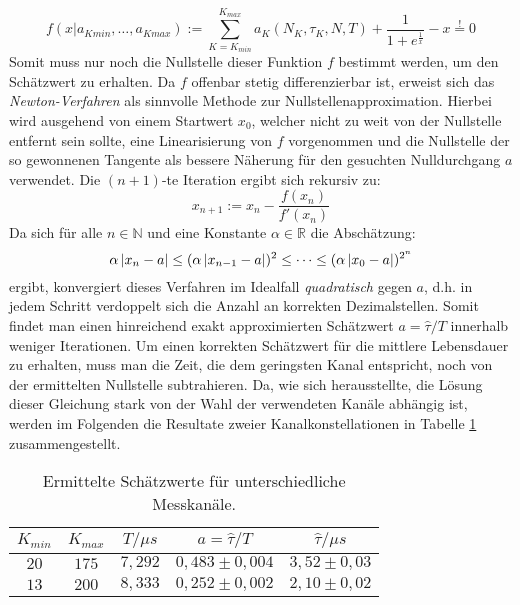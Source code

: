 		\begin{equation} \label{eq:mastereq}
					f(x|a_{Kmin},\dots,a_{Kmax}) := \sum_{K = K_{min}}^{K_{max}} a_K(N_K,\tau_K,N,T) + \frac{1}{1 + e^{\frac{1}{x}}} - x \overset{!}{=} 0  
		\end{equation}
	Somit muss nur noch die Nullstelle dieser Funktion $f$ bestimmt werden, um den Schätzwert zu erhalten. Da $f$ offenbar stetig differenzierbar ist, erweist sich das \textit{Newton-Verfahren} als sinnvolle Methode zur Nullstellenapproximation. Hierbei wird ausgehend von einem Startwert $x_0$, welcher nicht zu weit von der Nullstelle entfernt sein sollte, eine Linearisierung von $f$ vorgenommen und die Nullstelle der so gewonnenen Tangente als bessere Näherung für den gesuchten Nulldurchgang $a$ verwendet. Die $(n+1)$-te Iteration ergibt sich rekursiv zu:
		\begin{equation} 
			x_{n+1} := x_n - \frac{f(x_n)}{f'(x_n)}
		\end{equation}
	Da sich für alle $n\in \mathbb{N}$ und eine Konstante $\alpha\in \mathbb{R}$ die Abschätzung:
		 \begin{equation} 
		 			\alpha \left\vert x_{n}-a\right\vert\leq (\alpha \left\vert x_{n-1}-a\right\vert)^2\leq \dots \leq (\alpha\left\vert x_0-a\right\vert)^{2^n}
		 \end{equation}
	ergibt, konvergiert dieses Verfahren im Idealfall \textit{quadratisch} gegen $a$, d.h. in jedem Schritt verdoppelt sich die Anzahl an korrekten Dezimalstellen. Somit findet man einen hinreichend exakt approximierten Schätzwert $a = \hat{\tau}/T$ innerhalb weniger Iterationen. Um einen korrekten Schätzwert für die mittlere Lebensdauer zu erhalten, muss man die Zeit, die dem geringsten Kanal entspricht, noch von der ermittelten Nullstelle subtrahieren. Da, wie sich herausstellte, die Lösung dieser Gleichung stark von der Wahl der verwendeten Kanäle abhängig ist, werden im Folgenden die Resultate zweier Kanalkonstellationen in Tabelle \ref{table:resExp}  zusammengestellt.\\
		\begin{table}[hp]
			\centering
			\begin{tabular}{c|c|c|c|c} 
				$K_{min}$		&		$K_{max}$		&		$T/\mu s$		&		$a = \hat{\tau}/T$		&		$\hat{\tau}/\mu s$\\
				\hline
				$20$			&		$175$			&		$7,292$			&		$0,483 \pm 0,004$		&		$3,52 \pm 0,03$\\	
				$13$			&		$200$			&		$8,333$			&		$0,252 \pm 0,002$		&		$2,10 \pm 0,02$		
			\end{tabular}
			\caption{Ermittelte Schätzwerte für unterschiedliche Messkanäle.}
			\label{table:resExp} 
		\end{table}
